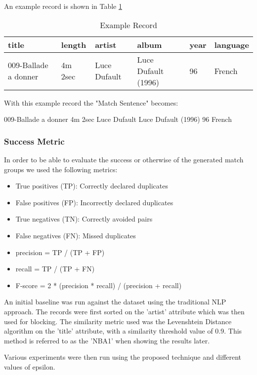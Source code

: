 \documentclass{article}
\begin{document}
An example record is shown in Table \ref{tab:examplerecord}

\begin{table}[h]
 \caption{Example Record}
  \begin{tabular}{|l|l|l|l|l|l|}
    \hline
    \textbf{title} & \textbf{length} & \textbf{artist} & \textbf{album} & \textbf{year} & \textbf{language} \\
    \hline\hline
    009-Ballade a donner & 4m 2sec & Luce Dufault & Luce Dufault (1996) & 96 & French \\
    \hline
  \end{tabular}
  \label{tab:examplerecord}
\end{table}

With this example record the "Match Sentence" becomes:

\colorbox{shadecolor}{009-Ballade a donner 4m 2sec Luce Dufault Luce Dufault (1996) 96 French}


\subsubsection{Success Metric}
In order to be able to evaluate the success or otherwise of the generated match groups we used the following metrics:

\begin{itemize}
\item True positives (TP): Correctly declared duplicates
\item False positives (FP): Incorrectly declared duplicates
\item True negatives (TN): Correctly avoided pairs
\item False negatives (FN): Missed duplicates
\item precision = TP / (TP + FP)
\item recall = TP / (TP + FN)
\item F-score = 2 * (precision * recall) / (precision + recall)
\end{itemize}

An initial baseline was run against the dataset using the traditional NLP approach. The records were first sorted on the 'artist' attribute which was then used for blocking. The similarity metric used was the Levenshtein Distance algorithm on the 'title' attribute, with a similarity threshold value of 0.9. This method is referred to as the 'NBA1' when showing the results later.

Various experiments were then run using the proposed technique and different values of epsilon.
\end{document}
